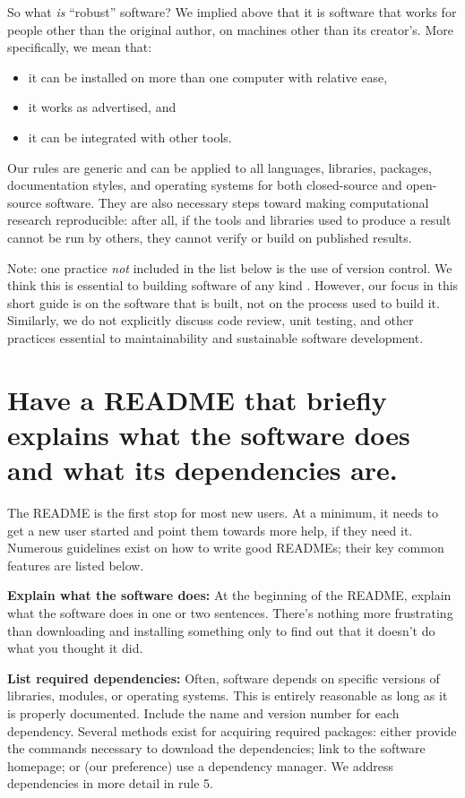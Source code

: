 \documentclass[10pt,letterpaper]{article}
\begin{document}
So what \emph{is} ``robust'' software?
We implied above that it is software that works for people other than the original author,
on machines other than its creator's.
More specifically, we mean that:

\begin{itemize}
\item
  it can be installed on more than one computer with relative ease,
\item
  it works as advertised, and
\item
  it can be integrated with other tools.
\end{itemize}

Our rules are generic and can be applied to all languages, libraries, packages,
documentation styles, and operating systems for both closed-source and open-source software.  
They are also necessary steps toward making computational research reproducible:
after all,
if the tools and libraries used to produce a result cannot be run by others,
they cannot verify or build on published results.

Note: one practice \emph{not} included in the list below is the use of version control.
We think this is essential to building software of any kind
\cite{wilson2014,wilson2016}.
However,
our focus in this short guide is on the software that is built,
not on the process used to build it.
Similarly,
we do not explicitly discuss code review,
unit testing,
and other practices essential to maintainability and sustainable software development.

\section{Have a README that briefly explains what the software does and what its dependencies are.}

The README is the first stop for most new users.
At a minimum, it needs to get a new user started and point them towards more
help, if they need it. 
Numerous guidelines exist on how to write good
READMEs\cite{Johnson1997,gnustandards};
their key common features are listed below.

\textbf{Explain what the software does:} At the beginning of the README,
explain what the software does in one or two sentences.
There's nothing more frustrating
than downloading and installing something only to
find out that it doesn't do what you thought it did.

\textbf{List required dependencies:} Often, software depends on
specific versions of libraries, modules, or operating systems. 
This is
entirely reasonable as long as it is properly documented. Include the name and
version number for each dependency.  Several methods exist for acquiring
required packages: either provide the commands necessary to download the
dependencies; link to the software homepage; or (our preference) use a
dependency manager. We address dependencies in more detail in rule 5.
\end{document}
